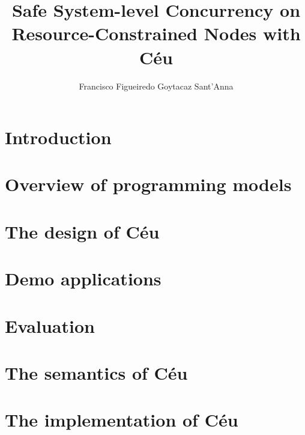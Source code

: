 \documentclass[phd,twoside,british]{ThesisPUC_uk}
\author{Francisco Figueiredo Goytacaz Sant'Anna}
\title{Safe System-level Concurrency on Resource-Constrained Nodes with C\'eu}
\newcommand{\1}{\;}
\newcommand{\2}{\;\;}
\newcommand{\3}{\;\;\;}
\newcommand{\5}{\;\;\;\;\;}
\begin{document}


\chapter{Introduction}
    \label{sec.intro}
    

\chapter{Overview of programming models}
    \label{sec.models}
    

\chapter{The design of C\'eu}
    \label{sec.ceu}
    

\chapter{Demo applications}
    \label{sec.demos}
    

\chapter{Evaluation}
    \label{sec.eval}
    

\chapter{The semantics of C\'eu}
    \label{sec.formal}
    

\chapter{The implementation of C\'eu}
    \label{sec.impl}
    

\end{document}
